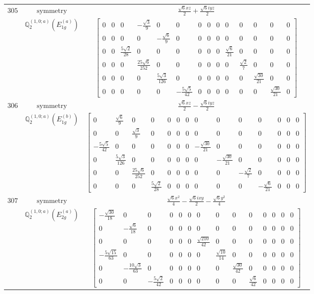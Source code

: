 \documentclass[fleqn,8pt,landscape]{jsarticle}
\begin{document}
\begin{longtable}{ccc}
$ 305 $ & $ \text{symmetry} $ & $ \frac{\sqrt{6} x z}{2} + \frac{\sqrt{6} i y z}{2} $ \\
$  $ & $ \mathbb{Q}_{2}^{(1,0;a)}(E_{1g}^{(a)}) $ & $ \begin{bmatrix} 0 & 0 & 0 & - \frac{\sqrt{3}}{9} & 0 & 0 & 0 & 0 & 0 & 0 & 0 & 0 & 0 & 0 \\ 0 & 0 & 0 & 0 & - \frac{\sqrt{6}}{9} & 0 & 0 & 0 & 0 & 0 & 0 & 0 & 0 & 0 \\ 0 & 0 & \frac{5 \sqrt{2}}{28} & 0 & 0 & 0 & 0 & 0 & 0 & \frac{\sqrt{6}}{21} & 0 & 0 & 0 & 0 \\ 0 & 0 & 0 & \frac{25 \sqrt{6}}{252} & 0 & 0 & 0 & 0 & 0 & 0 & \frac{\sqrt{2}}{7} & 0 & 0 & 0 \\ 0 & 0 & 0 & 0 & \frac{5 \sqrt{3}}{126} & 0 & 0 & 0 & 0 & 0 & 0 & \frac{\sqrt{30}}{21} & 0 & 0 \\ 0 & 0 & 0 & 0 & 0 & - \frac{5 \sqrt{5}}{42} & 0 & 0 & 0 & 0 & 0 & 0 & \frac{\sqrt{30}}{21} & 0 \end{bmatrix} $ \\ \hline
$ 306 $ & $ \text{symmetry} $ & $ \frac{\sqrt{6} x z}{2} - \frac{\sqrt{6} i y z}{2} $ \\
$  $ & $ \mathbb{Q}_{2}^{(1,0;a)}(E_{1g}^{(b)}) $ & $ \begin{bmatrix} 0 & \frac{\sqrt{6}}{9} & 0 & 0 & 0 & 0 & 0 & 0 & 0 & 0 & 0 & 0 & 0 & 0 \\ 0 & 0 & \frac{\sqrt{3}}{9} & 0 & 0 & 0 & 0 & 0 & 0 & 0 & 0 & 0 & 0 & 0 \\ - \frac{5 \sqrt{5}}{42} & 0 & 0 & 0 & 0 & 0 & 0 & - \frac{\sqrt{30}}{21} & 0 & 0 & 0 & 0 & 0 & 0 \\ 0 & \frac{5 \sqrt{3}}{126} & 0 & 0 & 0 & 0 & 0 & 0 & - \frac{\sqrt{30}}{21} & 0 & 0 & 0 & 0 & 0 \\ 0 & 0 & \frac{25 \sqrt{6}}{252} & 0 & 0 & 0 & 0 & 0 & 0 & - \frac{\sqrt{2}}{7} & 0 & 0 & 0 & 0 \\ 0 & 0 & 0 & \frac{5 \sqrt{2}}{28} & 0 & 0 & 0 & 0 & 0 & 0 & - \frac{\sqrt{6}}{21} & 0 & 0 & 0 \end{bmatrix} $ \\ \hline
$ 307 $ & $ \text{symmetry} $ & $ \frac{\sqrt{6} x^{2}}{4} - \frac{\sqrt{6} i x y}{2} - \frac{\sqrt{6} y^{2}}{4} $ \\
$  $ & $ \mathbb{Q}_{2}^{(1,0;a)}(E_{2g}^{(a)}) $ & $ \begin{bmatrix} - \frac{\sqrt{30}}{18} & 0 & 0 & 0 & 0 & 0 & 0 & 0 & 0 & 0 & 0 & 0 & 0 & 0 \\ 0 & - \frac{\sqrt{6}}{18} & 0 & 0 & 0 & 0 & 0 & 0 & 0 & 0 & 0 & 0 & 0 & 0 \\ 0 & 0 & 0 & 0 & 0 & 0 & \frac{\sqrt{210}}{42} & 0 & 0 & 0 & 0 & 0 & 0 & 0 \\ - \frac{5 \sqrt{15}}{63} & 0 & 0 & 0 & 0 & 0 & 0 & \frac{\sqrt{10}}{14} & 0 & 0 & 0 & 0 & 0 & 0 \\ 0 & - \frac{10 \sqrt{3}}{63} & 0 & 0 & 0 & 0 & 0 & 0 & \frac{\sqrt{30}}{42} & 0 & 0 & 0 & 0 & 0 \\ 0 & 0 & - \frac{5 \sqrt{2}}{42} & 0 & 0 & 0 & 0 & 0 & 0 & \frac{\sqrt{6}}{42} & 0 & 0 & 0 & 0 \end{bmatrix} $ \\ \hline

\end{longtable}
\end{document}

